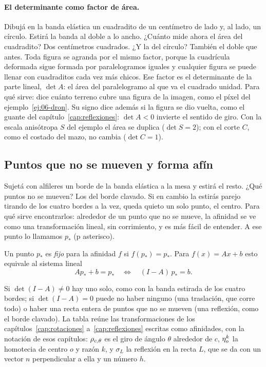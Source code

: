 \paragraph{El determinante como factor de área.}
Dibujá en la banda elástica un cuadradito de un centímetro de lado y, al lado, un círculo.
Estirá la banda al doble a lo ancho. ¿Cuánto mide ahora el área del cuadradito? Dos
centímetros cuadrados. ¿Y la del círculo? También el doble que antes. Toda figura se agranda
por el mismo factor, porque la cuadrícula deformada sigue formada por paralelogramos iguales y
cualquier figura se puede llenar con cuadraditos cada vez más chicos. Ese factor es el
determinante de la parte lineal, \(\det A\): el área del paralelogramo al que va el cuadrado
unidad. Para qué sirve: dice cuánto terreno cubre una figura de la imagen, como el píxel del
ejemplo~\ref{ej:06-dron}. Su signo dice además si la figura se dio vuelta, como el guante del
capítulo~\ref{cap:reflexiones}: \(\det A<0\) invierte el sentido de giro. Con la escala
anisótropa \(S\) del ejemplo el área se duplica (\(\det S=2\)); con el corte \(C\), como el
costado del mazo, no cambia (\(\det C=1\)).

\subsection{Puntos que no se mueven y forma afín}\label{sec:puntos-fijos-afin}

Sujetá con alfileres un borde de la banda elástica a la mesa y estirá el resto. ¿Qué puntos no
se mueven? Los del borde clavado. Si en cambio la estirás parejo tirando de los cuatro
bordes a la vez, queda quieto un solo punto, el centro. Para qué sirve encontrarlos: alrededor de un punto que no se
mueve, la afinidad se ve como una transformación lineal, sin corrimiento, y es más fácil de
entender. A ese punto lo llamamos \(p_\ast\) (p asterisco).

\begin{definicion}\label{def:06-punto-fijo}
Un punto \(p_\ast\) es \emph{fijo} para la afinidad \(f\) si \(f(p_\ast)=p_\ast\). Para
\(f(x)=Ax+b\) esto equivale al sistema lineal
\[
  Ap_\ast+b=p_\ast
  \quad\Longleftrightarrow\quad
  (I-A)\,p_\ast=b .
\]
\end{definicion}

Si \(\det(I-A)\neq0\) hay uno solo, como con la banda estirada de los cuatro bordes; si
\(\det(I-A)=0\) puede no haber ninguno (una traslación, que corre todo) o haber una recta
entera de puntos que no se mueven (una reflexión, como el borde clavado). La tabla reúne las
transformaciones de los capítulos~\ref{cap:rotaciones} a~\ref{cap:reflexiones} escritas como
afinidades, con la notación de esos capítulos: \(\rho_{c,\theta}\) es el giro de ángulo
\(\theta\) alrededor de \(c\), \(\eta_{o}^{k}\) la homotecia de centro \(o\) y razón \(k\), y
\(\sigma_L\) la reflexión en la recta \(L\), que se da con un vector \(n\) perpendicular a ella
y un número \(h\).


